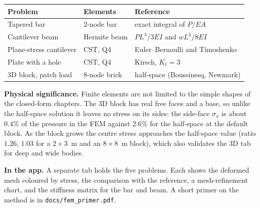 \documentclass[11pt,a4paper]{article}
\newcommand{\app}[1]{\par\smallskip\noindent\textbf{In the app.} #1}
\newcommand{\sig}[1]{\par\smallskip\noindent\textbf{Physical significance.} #1}
\begin{document}
\begin{center}\small
\begin{tabular}{@{}p{3.6cm}p{3.6cm}p{6.2cm}@{}}\toprule
Problem & Elements & Reference\\\midrule
Tapered bar & 2-node bar & exact integral of $P/EA$\\
Cantilever beam & Hermite beam & $PL^3/3EI$ and $wL^4/8EI$\\
Plane-stress cantilever & CST, Q4 & Euler--Bernoulli and Timoshenko\\
Plate with a hole & CST, Q4 & Kirsch, $K_t=3$\\
3D block, patch load & 8-node brick & half-space (Boussinesq, Newmark)\\\bottomrule
\end{tabular}
\end{center}

\sig{Finite elements are not limited to the simple shapes of the closed-form chapters. The 3D block has real free faces and a base, so unlike the half-space solution it leaves no stress on its sides: the side-face $\sigma_x$ is about $0.4\%$ of the pressure in the FEM against $2.6\%$ for the half-space at the default block. As the block grows the centre stress approaches the half-space value (ratio $1.26,\,1.03$ for a $2\times3$~m and an $8\times8$~m block), which also validates the 3D tab for deep and wide bodies.}
\app{A separate tab holds the five problems. Each shows the deformed mesh coloured by stress, the comparison with the reference, a mesh-refinement chart, and the stiffness matrix for the bar and beam. A short primer on the method is in \texttt{docs/fem\_primer.pdf}.}
\end{document}
